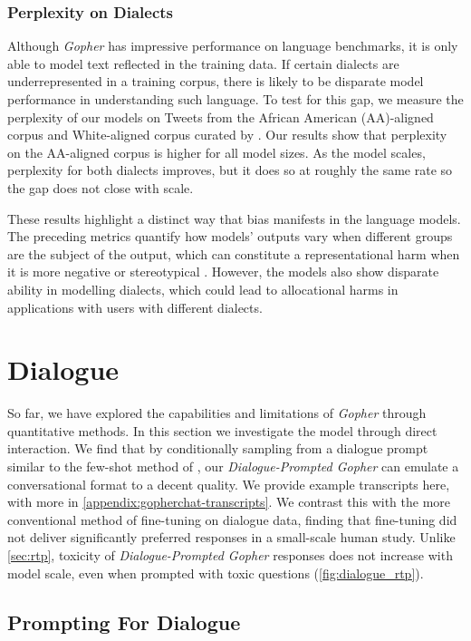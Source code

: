 \subsubsection{Perplexity on Dialects}

Although \textit{Gopher} has impressive performance on language benchmarks, it is only able to model text reflected in the training data. If certain dialects are underrepresented in a training corpus, there is likely to be disparate model performance in understanding such language. To test for this gap, we measure the perplexity of our models on Tweets from the African American (AA)-aligned corpus and White-aligned corpus curated by \citet{twitteraae}. Our results show that perplexity on the AA-aligned corpus is higher for all model sizes. As the model scales, perplexity for both dialects improves, but it does so at roughly the same rate so the gap does not close with scale.

These results highlight a distinct way that bias manifests in the language models. The preceding metrics quantify how models' outputs vary when different groups are the subject of the output, which can constitute a representational harm when it is more negative or stereotypical \citep{blodgett2020language}. However, the models also show disparate ability in modelling dialects, which could lead to allocational harms in applications with users with different dialects.

\section{Dialogue}
\label{sec:dialogue}
So far, we have explored the capabilities and limitations of \textit{Gopher} through quantitative methods. In this section we investigate the model through direct interaction. We find that by conditionally sampling from a dialogue prompt similar to the few-shot method of \citet{gpt3}, our \textit{Dialogue-Prompted Gopher} can emulate a conversational format to a decent quality. We provide example transcripts here, with more in \autoref{appendix:gopherchat-transcripts}. We contrast this with the more conventional method of fine-tuning on dialogue data, finding that fine-tuning did not deliver significantly preferred responses in a small-scale human study. Unlike \autoref{sec:rtp}, toxicity of \textit{Dialogue-Prompted Gopher}  responses does not increase with model scale, even when prompted with toxic questions (\autoref{fig:dialogue_rtp}).

\subsection{Prompting For Dialogue}

